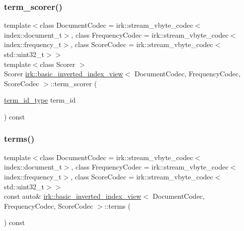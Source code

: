\mbox{\label{classirk_1_1basic__inverted__index__view_af30c9c8277058831a878ea9eb18840ba}} 
\subsubsection{\texorpdfstring{term\+\_\+scorer()}{term\_scorer()}}
{\footnotesize\ttfamily template$<$class Document\+Codec  = irk\+::stream\+\_\+vbyte\+\_\+codec$<$index\+::document\+\_\+t$>$, class Frequency\+Codec  = irk\+::stream\+\_\+vbyte\+\_\+codec$<$index\+::frequency\+\_\+t$>$, class Score\+Codec  = irk\+::stream\+\_\+vbyte\+\_\+codec$<$std\+::uint32\+\_\+t$>$$>$ \\
template$<$class Scorer $>$ \\
Scorer \mbox{\hyperlink{classirk_1_1basic__inverted__index__view}{irk\+::basic\+\_\+inverted\+\_\+index\+\_\+view}}$<$ Document\+Codec, Frequency\+Codec, Score\+Codec $>$\+::term\+\_\+scorer (\begin{DoxyParamCaption}\item[{\mbox{\hyperlink{classirk_1_1basic__inverted__index__view_a6b272abc76df208ce59bac93810e7331}{term\+\_\+id\+\_\+type}}}]{term\+\_\+id }\end{DoxyParamCaption}) const\hspace{0.3cm}{\ttfamily [inline]}}

\mbox{\label{classirk_1_1basic__inverted__index__view_ad1d0983d65f8001c3ced2c4cd424eca3}} 
\subsubsection{\texorpdfstring{terms()}{terms()}}
{\footnotesize\ttfamily template$<$class Document\+Codec  = irk\+::stream\+\_\+vbyte\+\_\+codec$<$index\+::document\+\_\+t$>$, class Frequency\+Codec  = irk\+::stream\+\_\+vbyte\+\_\+codec$<$index\+::frequency\+\_\+t$>$, class Score\+Codec  = irk\+::stream\+\_\+vbyte\+\_\+codec$<$std\+::uint32\+\_\+t$>$$>$ \\
const auto\& \mbox{\hyperlink{classirk_1_1basic__inverted__index__view}{irk\+::basic\+\_\+inverted\+\_\+index\+\_\+view}}$<$ Document\+Codec, Frequency\+Codec, Score\+Codec $>$\+::terms (\begin{DoxyParamCaption}{ }\end{DoxyParamCaption}) const\hspace{0.3cm}{\ttfamily [inline]}}

